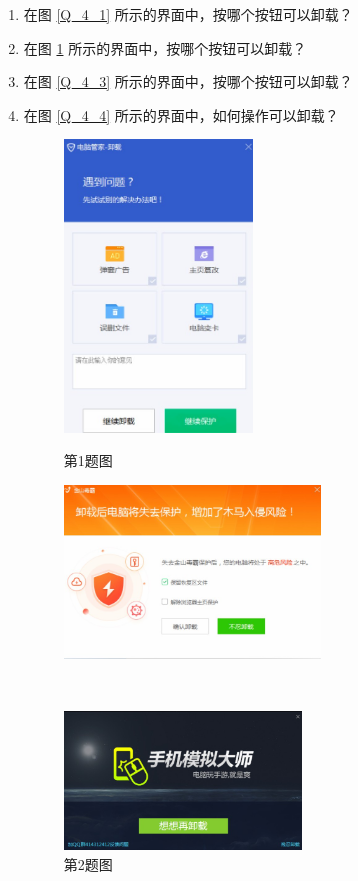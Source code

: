 \begin{enumerate}
  \item 在图 \ref{Q_4_1} 所示的界面中，按哪个按钮可以卸载？
  \item 在图 \ref{Q_4_2} 所示的界面中，按哪个按钮可以卸载？
  \item 在图 \ref{Q_4_3} 所示的界面中，按哪个按钮可以卸载？
  \item 在图 \ref{Q_4_4} 所示的界面中，如何操作可以卸载？
    \begin{figure}[htb!]
      \centering
      \begin{minipage}{5.5cm}
        \centering
        \includegraphics[width=5cm]{assets/Q_4_1.jpg}
        \caption{第1题图}
        \label{Q_4_1}
      \end{minipage}
      \qquad
      \begin{minipage}{7.5cm}
        \centering
        \includegraphics[width=6.8cm]{assets/Q_4_2.jpg}
        \caption{第2题图}
        \label{Q_4_2}
      \end{minipage}
      \\\vspace*{2ex}
      \begin{minipage}{6.7cm}
        \centering
        \includegraphics[width=6.3cm]{assets/Q_4_3.jpg}

\end{minipage}
\end{figure}
\end{enumerate}
